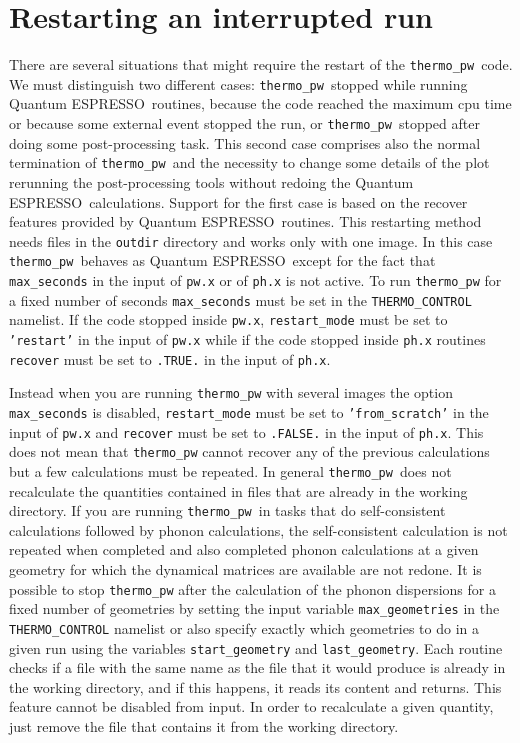 \documentclass[12pt,a4paper]{article}
\def\qe{{\sc Quantum ESPRESSO}}
\def\thermo{\texttt{thermo\_pw}}
\begin{document}
\newpage
\section{\color{coral}Restarting an interrupted run}

There are several situations that might require the restart of the \thermo\ 
code. We must distinguish two different cases:
\thermo\ stopped while running \qe\ routines, because the code reached
the maximum cpu time or because some external event stopped the run,
or \thermo\ stopped after doing some post-processing task. This second 
case comprises also the normal termination of
\thermo\ and the necessity to change some details of the plot rerunning
the post-processing tools without redoing the \qe\ calculations.
Support for the first case is based on the recover features provided by 
\qe\ routines. This restarting method needs files in the \texttt{outdir}
directory and works only with one image. In this case \thermo\ behaves as \qe\ 
except for the fact that \texttt{max\_seconds} in the input of \texttt{pw.x} or
of \texttt{ph.x} is not active. To run \texttt{thermo\_pw}
for a fixed number of seconds \texttt{max\_seconds} must be set in the
\texttt{THERMO\_CONTROL} namelist. If the code stopped inside \texttt{pw.x},
\texttt{restart\_mode} must be set to \texttt{'restart'} in the input of 
\texttt{pw.x} while if the code stopped inside \texttt{ph.x} routines
\texttt{recover} must be set to \texttt{.TRUE.} in the input of \texttt{ph.x}.

Instead when you are running \texttt{thermo\_pw} with several images the option 
\texttt{max\_seconds} is disabled, \texttt{restart\_mode} must 
be set to \texttt{'from\_scratch'} in the input of \texttt{pw.x} and
\texttt{recover} must be set to \texttt{.FALSE.} in the input of \texttt{ph.x}.
This does not mean that \texttt{thermo\_pw} cannot recover any of the previous
calculations but a few calculations must be repeated. In general \thermo\ 
does not recalculate the quantities contained in files that are already 
in the working directory. If you are running \thermo\ in tasks that do 
self-consistent calculations followed by phonon calculations, the 
self-consistent calculation is not repeated 
when completed and also completed phonon calculations at a given
geometry for which the dynamical matrices are available are
not redone. It is possible to stop \texttt{thermo\_pw} after the 
calculation of the phonon dispersions for a fixed number of geometries 
by setting the input variable \texttt{max\_geometries} in the 
\texttt{THERMO\_CONTROL} namelist or also specify exactly which geometries
to do in a given run using the variables \texttt{start\_geometry} and
\texttt{last\_geometry}.
Each routine checks if a file with the same name
as the file that it would produce is already in the working directory,
and if this happens, it reads its content and returns. This feature cannot be
disabled from input. In order to recalculate a given quantity, just remove
the file that contains it from the working directory.
\end{document}
